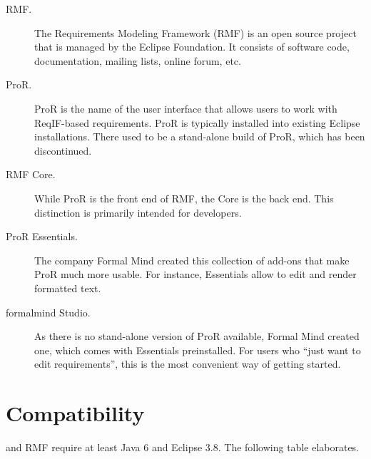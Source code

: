 \begin{description}
\item[RMF.] The Requirements Modeling Framework (RMF) is an open source project that is managed by the Eclipse Foundation.  It consists of software code, documentation, mailing lists, online forum, etc.
\item[ProR.] ProR is the name of the user interface that allows users to work with ReqIF-based requirements.  ProR is typically installed into existing Eclipse installations.  There used to be a stand-alone build of ProR, which has been discontinued.
\item[RMF Core.] While ProR is the front end of RMF, the Core is the back end.  This distinction is primarily intended for developers.
\item[ProR Essentials.] The company Formal Mind created this collection of add-ons that make ProR much more usable.  For instance, Essentials allow to edit and render formatted text.
\item[formalmind Studio.] As there is no stand-alone version of ProR available, Formal Mind created one, which comes with Essentials preinstalled.  For users who ``just want to edit requirements'', this is the most convenient way of getting started.
\end{description}

\section{Compatibility}

\pror{} and RMF require at least Java 6 and Eclipse 3.8.  The following table elaborates.




